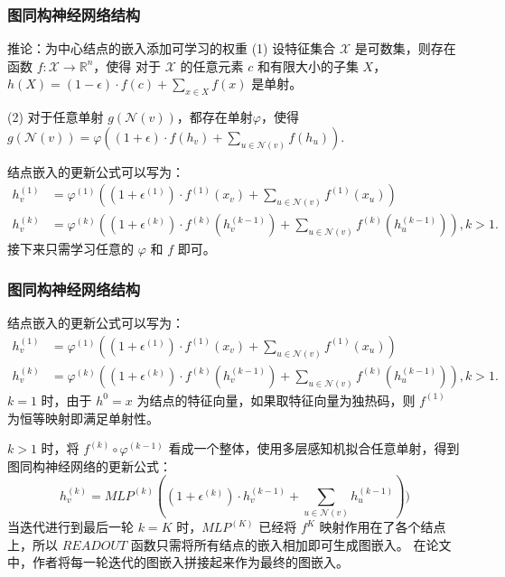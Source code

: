 \documentclass{beamer}
\begin{document}
\begin{frame}

  \frametitle{图同构神经网络结构}
  \begin{alertblock}{推论：为中心结点的嵌入添加可学习的权重}
    (1) 设特征集合 $\mathcal{X}$ 是可数集，则存在函数 $f: \mathcal{X} \rightarrow \mathbb{R}^n$，使得
    对于 $\mathcal{X}$ 的任意元素 $c$ 和有限大小的子集 $X$，$h(X) = (1 - \epsilon) \cdot f(c) + \sum_{x \in X} f(x)$ 是单射。
    
    (2) 对于任意单射 $g(\mathcal{N}(v))$，都存在单射$\varphi$，使得 $g(\mathcal{N}(v)) = \varphi((1 + \epsilon) \cdot f(h_v) + \sum_{u \in \mathcal{N}(v)} f(h_u))$.
  \end{alertblock}
  结点嵌入的更新公式可以写为：
  \begin{align*}
    h_v^{(1)} &= \varphi^{(1)}((1 + \epsilon^{(1)}) \cdot f^{(1)}(x_v) + \sum_{u \in \mathcal{N}(v)} f^{(1)}(x_u)) \\
    h_v^{(k)} &= \varphi^{(k)}((1 + \epsilon^{(k)}) \cdot f^{(k)}(h^{(k-1)}_v) + \sum_{u \in \mathcal{N}(v)} f^{(k)}(h^{(k-1)}_u)), k > 1.
  \end{align*}
  接下来只需学习任意的 $\varphi$ 和 $f$ 即可。

\end{frame}

\begin{frame}

  \frametitle{图同构神经网络结构}
  结点嵌入的更新公式可以写为：
  \begin{align*}
    h_v^{(1)} &= \varphi^{(1)}((1 + \epsilon^{(1)}) \cdot f^{(1)}(x_v) + \sum_{u \in \mathcal{N}(v)} f^{(1)}(x_u)) \\
    h_v^{(k)} &= \varphi^{(k)}((1 + \epsilon^{(k)}) \cdot f^{(k)}(h^{(k-1)}_v) + \sum_{u \in \mathcal{N}(v)} f^{(k)}(h^{(k-1)}_u)), k > 1.
  \end{align*}
  $k = 1$ 时，由于 $h^0 = x$ 为结点的特征向量，如果取特征向量为独热码，则 $f^{(1)}$ 为恒等映射即满足单射性。

  $k > 1$ 时，将 $f^{(k)} \circ \varphi^{(k-1)}$ 看成一个整体，使用多层感知机拟合任意单射，得到图同构神经网络的更新公式：
  $$
    h_v^{(k)} = MLP^{(k)} ((1 + \epsilon^{(k)}) \cdot h_v^{(k-1)} + \sum_{u \in \mathcal{N}(v)} h^{(k-1)}_u))
  $$
  当迭代进行到最后一轮 $k = K$ 时，$MLP^{(K)}$ 已经将 $f^{K}$ 映射作用在了各个结点上，所以 $READOUT$ 函数只需将所有结点的嵌入相加即可生成图嵌入。
  在论文中，作者将每一轮迭代的图嵌入拼接起来作为最终的图嵌入。
  

\end{frame}
\end{document}

